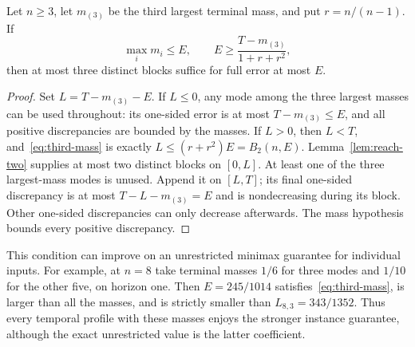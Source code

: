 \begin{lemma}
\label{lem:third-mass}
Let $n\ge3$, let $m_{(3)}$ be the third largest terminal mass, and put
$r=n/(n-1)$. If
\begin{equation}\label{eq:third-mass}
 \max_i m_i\le E,\qquad
 E\ge\frac{T-m_{(3)}}{1+r+r^2},
\end{equation}
then at most three distinct blocks suffice for full error at most $E$.
\end{lemma}
\begin{proof}
Set $L=T-m_{(3)}-E$. If $L\le0$, any mode among the three largest
masses can be used throughout: its one-sided error is at most
$T-m_{(3)}\le E$, and all positive discrepancies are bounded by the
masses. If $L>0$, then $L<T$, and~\eqref{eq:third-mass} is exactly
$L\le(r+r^2)E=B_2(n,E)$. Lemma~\ref{lem:reach-two} supplies at most
two distinct blocks on $[0,L]$. At least one of the three largest-mass
modes is unused. Append it on $[L,T]$; its final one-sided discrepancy
is at most $T-L-m_{(3)}=E$ and is nondecreasing during its block.
Other one-sided discrepancies can only decrease afterwards. The mass
hypothesis bounds every positive discrepancy.
\end{proof}

This condition can improve on an unrestricted minimax guarantee for
individual inputs. For example, at $n=8$ take terminal masses $1/6$
for three modes and $1/10$ for the other five, on horizon one. Then
$E=245/1014$ satisfies~\eqref{eq:third-mass}, is larger than all the
masses, and is strictly smaller than $L_{8,3}=343/1352$.
Thus every temporal profile with these masses enjoys the stronger
instance guarantee, although the exact unrestricted value is the latter
coefficient.

